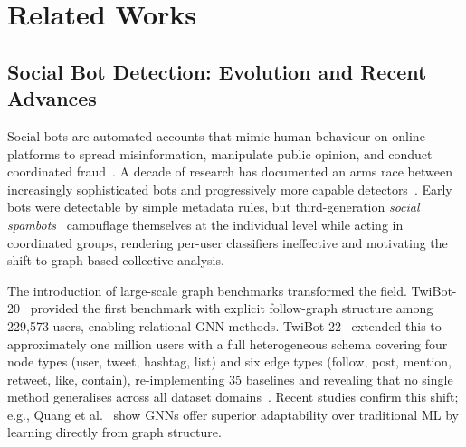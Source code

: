 \section{Related Works}
\label{sec:related}

\subsection{Social Bot Detection: Evolution and Recent Advances}

Social bots are automated accounts that mimic human behaviour on online platforms
to spread misinformation, manipulate public opinion, and conduct coordinated
fraud~\cite{cresci2020decade}.
A decade of research has documented an arms race between increasingly sophisticated
bots and progressively more capable detectors~\cite{cresci2020decade}.
Early bots were detectable by simple metadata rules, but third-generation
\emph{social spambots}~\cite{cresci2017paradigm} camouflage themselves at the
individual level while acting in coordinated groups, rendering per-user classifiers
ineffective and motivating the shift to graph-based collective analysis.

The introduction of large-scale graph benchmarks transformed the field.
TwiBot-20~\cite{feng2021twibot20} provided the first benchmark with explicit
follow-graph structure among 229{,}573 users, enabling relational GNN methods.
TwiBot-22~\cite{feng2022twibot22} extended this to approximately one million users
with a full heterogeneous schema covering four node types (user, tweet, hashtag,
list) and six edge types (follow, post, mention, retweet, like, contain),
re-implementing 35 baselines and revealing that no single method generalises
across all dataset domains~\cite{feng2022twibot22}.
Recent studies confirm this shift; e.g., Quang et al.~\cite{quang2026integrating} show GNNs offer superior adaptability over traditional ML by learning directly from graph structure.

